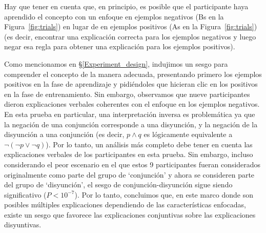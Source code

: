 Hay que tener en cuenta que, en principio, es posible que el participante haya aprendido el concepto con un enfoque en ejemplos negativos ({\sf B}s en la Figura~\ref{fig:trials}) en lugar de en ejemplos positivos ({\sf A}s en la Figura~\ref{fig:trials}) (es decir, encontrar una explicación correcta para los ejemplos negativos y luego negar esa regla para obtener una explicación para los ejemplos positivos).

Como mencionamos en \S\ref{Experiment_design}, indujimos un sesgo para comprender el concepto de la manera adecuada, presentando primero los ejemplos positivos en la fase de aprendizaje y pidiéndoles que hicieran clic en los positivos en la fase de entrenamiento. Sin embargo, observamos que nueve participantes dieron explicaciones verbales coherentes con el enfoque en los ejemplos negativos. En esta prueba en particular, una interpretación inversa es problemática ya que la negación de una conjunción corresponde a una disyunción, y la negación de la disyunción a una conjunción (es decir, $ p \land q $ es lógicamente equivalente a $ \lnot (\lnot p \lor \lnot q) $). Por lo tanto, un análisis más completo debe tener en cuenta las explicaciones verbales de los participantes en esta prueba. Sin embargo, incluso considerando el peor escenario en el que estos 9 participantes fueran considerados originalmente como parte del grupo de  `conjunción' y ahora se consideren parte del grupo de `disyunción', el sesgo de conjunción-disyunción sigue siendo significativo ($ P<10^{-7} $). Por lo tanto, concluimos que, en este marco donde son posibles múltiples explicaciones dependiendo de las características enfocadas, existe un sesgo que favorece las explicaciones conjuntivas sobre las explicaciones disyuntivas.

